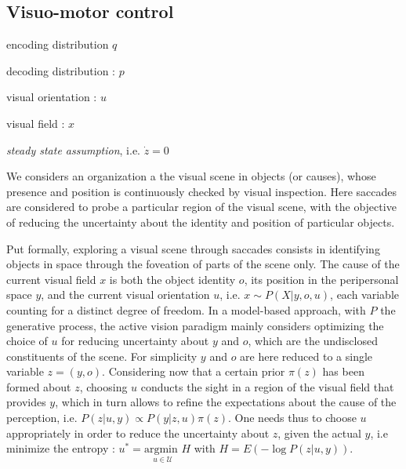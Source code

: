 \documentclass[12pt,twoside,openright]{article}
\begin{document}
		
	
	
	
	\subsection{Visuo-motor control}
	
	encoding distribution $q$
	
	decoding distribution : $p$
	
	visual orientation : $u$
	
	visual field : $x$
	
	\emph{steady state assumption}, i.e. $\dot{z} = 0$
	
	We considers an organization a the visual scene in objects (or causes), whose presence and position is continuously checked by visual inspection. Here saccades are considered to probe a particular region of the visual scene, with the objective of reducing the uncertainty about the identity and position of particular objects. %
	 	
	 Put formally, exploring a visual scene through saccades consists in identifying objects in space through the foveation of parts of the scene only. The cause of the current visual field $x$ is both the object identity $o$, its position in the peripersonal space $y$, and the current visual orientation $u$, i.e. $x \sim P(X|y,o,u)$, each variable counting for a distinct degree of freedom. %
	 In a model-based approach, with $P$ the generative process, the active vision paradigm mainly considers optimizing the choice of $u$ for reducing uncertainty about $y$ and $o$, which are the undisclosed constituents of the scene. For simplicity $y$ and $o$ are here reduced to a single variable $z = (y, o)$. Considering now that a certain prior $\pi(z)$ has been formed about $z$, choosing  $u$ conducts the sight in a region of the visual field that provides $y$, which in turn allows to refine the expectations about the cause of the perception, i.e.
	 $ P(z|u,y) \propto P(y|z,u) \pi(z)$. 
	 One needs thus to choose $u$ appropriately in order to reduce the uncertainty about $z$, given the actual $y$, i.e minimize the entropy :
	 $u^* = \underset{u \in \mathcal{U}}{\text{argmin }} H$ with $H = E(-\log P(z|u,y))$.
	 
\end{document}

